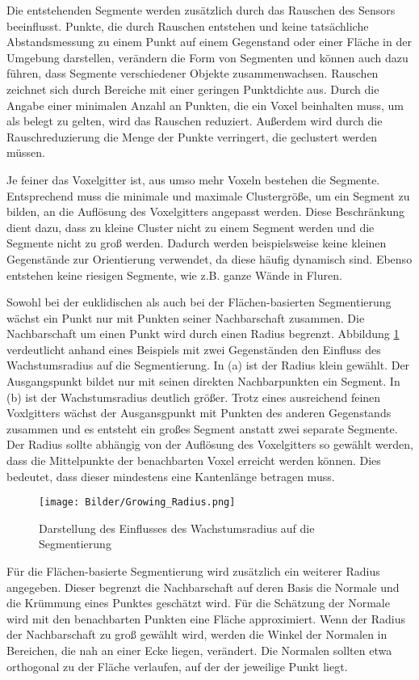 Die entstehenden Segmente werden zusätzlich durch das Rauschen des Sensors beeinflusst. Punkte, die durch Rauschen entstehen und keine tatsächliche Abstandsmessung zu einem Punkt auf einem Gegenstand oder einer Fläche in der Umgebung darstellen, verändern die Form von Segmenten und können auch dazu führen, dass Segmente verschiedener Objekte zusammenwachsen. Rauschen zeichnet sich durch Bereiche mit einer geringen Punktdichte aus. Durch die Angabe einer minimalen Anzahl an Punkten, die ein Voxel beinhalten muss, um als belegt zu gelten, wird das Rauschen reduziert. Außerdem wird durch die Rauschreduzierung die Menge der Punkte verringert, die geclustert werden müssen.  

Je feiner das Voxelgitter ist, aus umso mehr Voxeln bestehen die Segmente. Entsprechend muss die minimale und maximale Clustergröße, um ein Segment zu bilden, an die Auflösung des Voxelgitters angepasst werden. Diese Beschränkung dient dazu, dass zu kleine Cluster nicht zu einem Segment werden und die Segmente nicht zu groß werden. Dadurch werden beispielsweise keine kleinen Gegenstände zur Orientierung verwendet, da diese häufig dynamisch sind. Ebenso entstehen keine riesigen Segmente, wie z.B. ganze Wände in Fluren. 

Sowohl bei der euklidischen als auch bei der Flächen-basierten Segmentierung wächst ein Punkt nur mit Punkten seiner Nachbarschaft zusammen. Die Nachbarschaft um einen Punkt wird durch einen Radius begrenzt. Abbildung \ref{fig:Growing} verdeutlicht anhand eines Beispiels mit zwei Gegenständen den Einfluss des Wachstumsradius auf die Segmentierung. In (a) ist der Radius klein gewählt. Der Ausgangspunkt bildet nur mit seinen direkten Nachbarpunkten ein Segment. In (b) ist der Wachstumsradius deutlich größer. Trotz eines ausreichend feinen Voxlgitters wächst der Ausgansgpunkt mit Punkten des anderen Gegenstands zusammen und es entsteht ein großes Segment anstatt zwei separate Segmente. Der Radius sollte abhängig von der Auflösung des Voxelgitters so gewählt werden, dass die Mittelpunkte der benachbarten Voxel erreicht werden können. Dies bedeutet, dass dieser mindestens eine Kantenlänge betragen muss.  

\begin{figure}
	\centering
	\texttt{[image: Bilder/Growing\_Radius.png]}
	\caption{Darstellung des Einflusses des Wachstumsradius auf die Segmentierung}
	\label{fig:Growing}
\end{figure}

Für die Flächen-basierte Segmentierung wird zusätzlich ein weiterer Radius angegeben. Dieser begrenzt die Nachbarschaft auf deren Basis die Normale und die Krümmung eines Punktes geschätzt wird. Für die Schätzung der Normale wird mit den benachbarten Punkten eine Fläche approximiert. Wenn der Radius der Nachbarschaft zu groß gewählt wird, werden die Winkel der Normalen in Bereichen, die nah an einer Ecke liegen, verändert. Die Normalen sollten etwa orthogonal zu der Fläche verlaufen, auf der der jeweilige Punkt liegt. 

